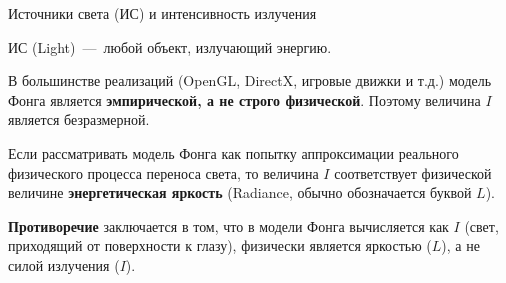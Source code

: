 \documentclass{beamer}
\begin{document}
	\begin{frame}{Источники света (ИС) и интенсивность излучения}

		ИС (Light)~---~любой объект, излучающий энергию. 

		В большинстве реализаций (OpenGL, DirectX, игровые движки и т.д.) модель Фонга является \textbf{эмпирической, а не строго физической}. Поэтому величина $I$ является безразмерной.

		\vspace{2mm}

		Если рассматривать модель Фонга как попытку аппроксимации реального физического процесса переноса света, то величина $I$ соответствует физической величине \textbf{энергетическая яркость} (Radiance, обычно обозначается буквой $L$).
		
		\textbf{Противоречие} заключается в том, что в модели Фонга вычисляется как $I$ (свет, приходящий от поверхности к глазу), физически является яркостью ($L$), а не силой излучения ($I$).



		
		

	\end{frame}
\end{document}
